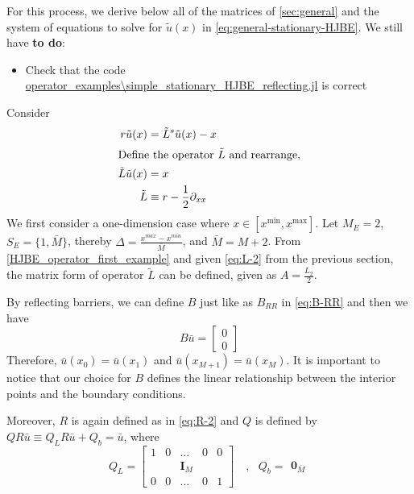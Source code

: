 \documentclass[11pt]{article}
\begin{document}
For this process, we derive below all of the matrices of \cref{sec:general} and the system of equations to solve for $\tilde{u}(x)$ in \cref{eq:general-stationary-HJBE}. We still have \textbf{to do}:
\begin{itemize}
	\item Check that the code \url{operator_examples\simple_stationary_HJBE_reflecting.jl} is correct
\end{itemize}
Consider
\begin{align}
r \tilde{u}(x) &= \tilde{L}^s \tilde{u}(x) - x\label{HJBE_reflecting_barriers_PDE}\\
\intertext{Define the operator $\tilde{L}$ and rearrange,}
\tilde{L} \tilde{u}(x) &= x\\
\tilde{L}&\equiv r - \frac{1}{2}\partial_{xx}\label{HJBE_operator_first_example}
\end{align}
We first consider a one-dimension case where $x\in [x^{\min},x^{\max}]$. Let $M_E = 2$, $S_E = \{1,\bar{M}\}$, thereby $\Delta  = \frac{x^{max}-x^{min}}{\bar{M}}$, and $\bar{M} = M+2$. From \cref{HJBE_operator_first_example} and given \cref{eq:L-2} from the previous section, the matrix form of operator $\tilde{L}$ can be defined, given as $A = \frac{L_2}{2}$.

By reflecting barriers, we can define $B$ just like as $B_{RR}$ in \cref{eq:B-RR} and then we have
\begin{equation}
B\bar{u} = \begin{bmatrix}
0\\
0
\end{bmatrix} \label{B_reflecting}
\end{equation}
Therefore, $\bar{u}(x_0) = \bar{u}(x_1)$ and $\bar{u}(x_{M+1}) = \bar{u}(x_M)$. It is important to notice that our choice for $B$ defines the linear relationship between the interior points and the boundary conditions.

Moreover, $R$ is again defined as in \cref{eq:R-2} and $Q$ is defined by $Q R\bar{u}\equiv Q_L R\bar{u}+Q_b = \bar{u}$, where
\begin{equation}
Q_L = \begin{bmatrix}
1& 0&\dots&0&0\\
 & & \mathbf{I}_M & & \\
0&0&\dots&0&1
\end{bmatrix}%
\quad , \text{ } Q_b = \begin{matrix}
\mathbf{0}_{\bar{M}}
\end{matrix}\label{Q_reflecting}
\end{equation}
\end{document}
